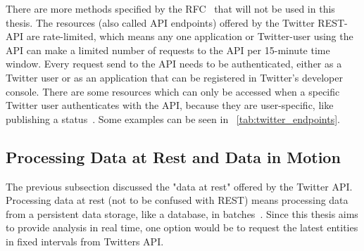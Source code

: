 There are more methods specified by the RFC~\cite{RFC2616} that will not be used in this thesis.
The resources (also called API endpoints) offered by the Twitter REST-API are rate-limited,
which means any one application or Twitter-user using the API can make a limited number of requests to the API
per 15-minute time window.
Every request send to the API needs to be authenticated,
either as a Twitter user or as an application that can be registered in Twitter's developer console.
There are some resources which can only be accessed when a specific Twitter user authenticates
with the API, because they are user-specific, like publishing a status~\cite{twitterDocs}.
Some examples can be seen in ~\cref{tab:twitter_endpoints}.

\begin{table}
    \caption{A selection of resources offered by the Twitter REST API~\cite{twitterDocs}}
    \label{tab:twitter_endpoints}
\end{table}

\subsection{Processing Data at Rest and Data in Motion}
\label{subsec:dataAtRest-DataInMotion}

The previous subsection discussed the "data at rest" offered by the Twitter API.
Processing data at rest (not to be confused with REST) means processing data from a persistent data storage, like a database, in batches~\cite{Nandi2015}.
Since this thesis aims to provide analysis in real time, one option would be to request the latest entities in fixed intervals from
Twitters API.

